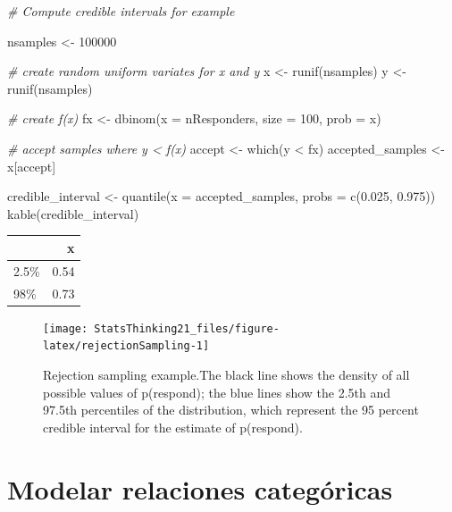 \documentclass[
  12pt,
]{book}
\newenvironment{Shaded}{\begin{snugshade}}{\end{snugshade}}
\newcommand{\AttributeTok}[1]{\textcolor[rgb]{0.77,0.63,0.00}{#1}}
\newcommand{\CommentTok}[1]{\textcolor[rgb]{0.56,0.35,0.01}{\textit{#1}}}
\newcommand{\DecValTok}[1]{\textcolor[rgb]{0.00,0.00,0.81}{#1}}
\newcommand{\FloatTok}[1]{\textcolor[rgb]{0.00,0.00,0.81}{#1}}
\newcommand{\FunctionTok}[1]{\textcolor[rgb]{0.00,0.00,0.00}{#1}}
\newcommand{\NormalTok}[1]{#1}
\newcommand{\OtherTok}[1]{\textcolor[rgb]{0.56,0.35,0.01}{#1}}
\newcommand{\SpecialCharTok}[1]{\textcolor[rgb]{0.00,0.00,0.00}{#1}}
\begin{document}
\begin{Shaded}
\begin{Highlighting}[]
\CommentTok{\# Compute credible intervals for example}

\NormalTok{nsamples }\OtherTok{\textless{}{-}} \DecValTok{100000}

\CommentTok{\# create random uniform variates for x and y}
\NormalTok{x }\OtherTok{\textless{}{-}} \FunctionTok{runif}\NormalTok{(nsamples)}
\NormalTok{y }\OtherTok{\textless{}{-}} \FunctionTok{runif}\NormalTok{(nsamples)}

\CommentTok{\# create f(x)}
\NormalTok{fx }\OtherTok{\textless{}{-}} \FunctionTok{dbinom}\NormalTok{(}\AttributeTok{x =}\NormalTok{ nResponders, }\AttributeTok{size =} \DecValTok{100}\NormalTok{, }\AttributeTok{prob =}\NormalTok{ x)}

\CommentTok{\# accept samples where y \textless{} f(x)}
\NormalTok{accept }\OtherTok{\textless{}{-}} \FunctionTok{which}\NormalTok{(y }\SpecialCharTok{\textless{}}\NormalTok{ fx)}
\NormalTok{accepted\_samples }\OtherTok{\textless{}{-}}\NormalTok{ x[accept]}

\NormalTok{credible\_interval }\OtherTok{\textless{}{-}} \FunctionTok{quantile}\NormalTok{(}\AttributeTok{x =}\NormalTok{ accepted\_samples, }
                              \AttributeTok{probs =} \FunctionTok{c}\NormalTok{(}\FloatTok{0.025}\NormalTok{, }\FloatTok{0.975}\NormalTok{))}
\FunctionTok{kable}\NormalTok{(credible\_interval)}
\end{Highlighting}
\end{Shaded}

\begin{tabular}{l|r}
\hline
  & x\\
\hline
2.5\% & 0.54\\
\hline
98\% & 0.73\\
\hline
\end{tabular}

\begin{figure}
\texttt{[image: StatsThinking21\_files/figure-latex/rejectionSampling-1]} \caption{Rejection sampling example.The black line shows the density of all possible values of p(respond); the blue lines show the 2.5th and 97.5th percentiles of the distribution, which represent the 95 percent credible interval for the estimate of p(respond).}\label{fig:rejectionSampling}
\end{figure}

\hypertarget{modelar-relaciones-categuxf3ricas}{%
\chapter{Modelar relaciones categóricas}\label{modelar-relaciones-categuxf3ricas}}
\end{document}
